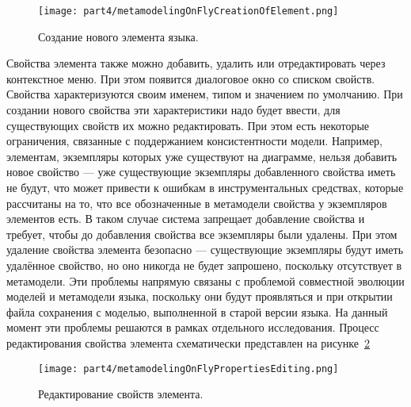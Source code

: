 \begin{figure} [ht]
	\begin{center}
		\texttt{[image: part4/metamodelingOnFlyCreationOfElement.png]}
		\caption{Создание нового элемента языка.}
		\label{image:metamodelingOnFlyCreationOfElement}
	\end{center}
\end{figure}

Свойства элемента также можно добавить, удалить или отредактировать через контекстное 
меню. При этом появится диалоговое окно со списком свойств. Свойства характеризуются 
своим именем, типом и значением по умолчанию. При создании нового свойства эти характеристики 
надо будет ввести, для существующих свойств их можно редактировать. При этом есть 
некоторые ограничения, связанные с поддержанием консистентности модели. Например, 
элементам, экземпляры которых уже существуют на диаграмме, нельзя добавить новое свойство 
--- уже существующие экземпляры добавленного свойства иметь не будут, что может привести 
к ошибкам в инструментальных средствах, которые рассчитаны на то, что все обозначенные 
в метамодели свойства у экземпляров элементов есть. В таком случае система запрещает 
добавление свойства и требует, чтобы до добавления свойства все экземпляры были удалены. 
При этом удаление свойства элемента безопасно --- существующие экземпляры будут иметь 
удалённое свойство, но оно никогда не будет запрошено, поскольку отсутствует в метамодели. 
Эти проблемы напрямую связаны с проблемой совместной эволюции моделей и метамодели языка, 
поскольку они будут проявляться и при открытии файла сохранения с моделью, выполненной в 
старой версии языка. На данный момент эти проблемы решаются в рамках отдельного исследования. 
Процесс редактирования свойства элемента схематически представлен на рисунке~\ref{image:metamodelingOnFlyPropertiesEditing}

\begin{figure} [ht]
	\begin{center}
		\texttt{[image: part4/metamodelingOnFlyPropertiesEditing.png]}
		\caption{Редактирование свойств элемента.}
		\label{image:metamodelingOnFlyPropertiesEditing}
	\end{center}
\end{figure}

